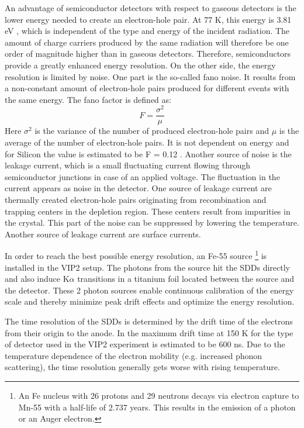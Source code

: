 An advantage of semiconductor detectors with respect to gaseous detectors is the lower energy needed to create an electron-hole pair. At 77 K, this energy is 3.81 eV \cite{Leo1993}, which is independent of the type and energy of the incident radiation. The amount of charge carriers produced by the same radiation will therefore be one order of magnitude higher than in gaseous detectors. Therefore, semiconductors provide a greatly enhanced energy resolution. On the other side, the energy resolution is limited by noise. One part is the so-called fano noise. It results from a non-constant amount of electron-hole pairs produced for different events with the same energy. The fano factor is defined as:
\begin{equation}
 F = \frac{\sigma^{2}}{\mu}
\end{equation} 
Here $\sigma^{2}$ is the variance of the number of produced electron-hole pairs and $\mu$ is the average of the number of electron-hole pairs. It is not dependent on energy and for Silicon the value is estimated to be F = 0.12 \cite{Leo1993}. Another source of noise is the leakage current, which is a small fluctuating current flowing through semiconductor junctions in case of an applied voltage. The fluctuation in the current appears as noise in the detector. One source of leakage current are thermally created electron-hole pairs originating from recombination and trapping centers in the depletion region. These centers result from impurities in the crystal. This part of the noise can be suppressed by lowering the temperature. Another source of leakage current are surface currents.

In order to reach the best possible energy resolution, an Fe-55 source \footnote{An Fe nucleus with 26 protons and 29 neutrons decays via electron capture to Mn-55 with a half-life of 2.737 years. This results in the emission of a photon or an Auger electron.} is installed in the VIP2 setup. The photons from the source hit the SDDs directly and also induce K$\alpha$ transitions in a titanium foil located between the source and the detector. These 2 photon sources enable continuous calibration of the energy scale and thereby minimize peak drift effects and optimize the energy resolution.

The time resolution of the SDDs is determined by the drift time of the electrons from their origin to the anode. In \cite{Lechner} the maximum drift time at 150 K for the type of detector used in the VIP2 experiment is estimated to be 600 ns. Due to the temperature dependence of the electron mobility (e.g. increased phonon scattering), the time resolution generally gets worse with rising temperature.



